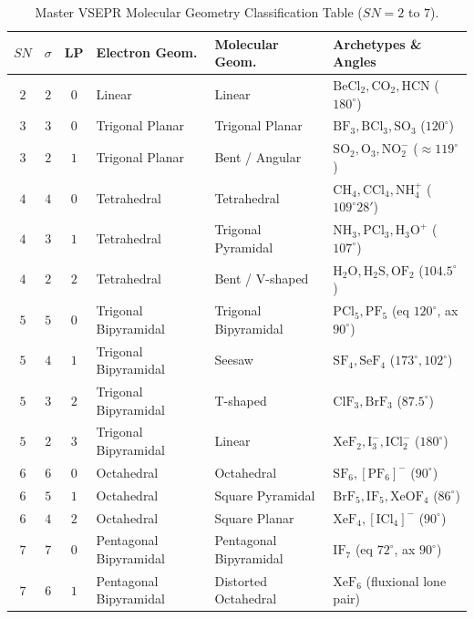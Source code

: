 \documentclass[10pt,twoside,openright]{book}
\begin{document}
\begin{table}[htbp]
\centering
\small
\renewcommand{\arraystretch}{1.25}
{\fontsize{7.5pt}{9.0pt}\selectfont\setlength{\tabcolsep}{1.5pt}
\begin{tabularx}{\linewidth}{c c c >{\RaggedRight\hsize=0.85\hsize}X >{\RaggedRight\hsize=0.95\hsize}X >{\RaggedRight\hsize=1.2\hsize}X}
\toprule
$SN$ & $\sigma$ & LP & \textbf{Electron Geom.} & \textbf{Molecular Geom.} & \textbf{Archetypes \& Angles} \\
\midrule
$2$ & $2$ & $0$ & Linear & Linear & $\mathrm{BeCl_2, CO_2, HCN}$ ($180^\circ$) \\
\midrule
$3$ & $3$ & $0$ & Trigonal Planar & Trigonal Planar & $\mathrm{BF_3, BCl_3, SO_3}$ ($120^\circ$) \\
$3$ & $2$ & $1$ & Trigonal Planar & Bent / Angular & $\mathrm{SO_2, O_3, NO_2^-}$ ($\approx 119^\circ$) \\
\midrule
$4$ & $4$ & $0$ & Tetrahedral & Tetrahedral & $\mathrm{CH_4, CCl_4, NH_4^+}$ ($109^\circ 28'$) \\
$4$ & $3$ & $1$ & Tetrahedral & Trigonal Pyramidal & $\mathrm{NH_3, PCl_3, H_3O^+}$ ($107^\circ$) \\
$4$ & $2$ & $2$ & Tetrahedral & Bent / V-shaped & $\mathrm{H_2O, H_2S, OF_2}$ ($104.5^\circ$) \\
\midrule
$5$ & $5$ & $0$ & Trigonal Bipyramidal & Trigonal Bipyramidal & $\mathrm{PCl_5, PF_5}$ (eq $120^\circ$, ax $90^\circ$) \\
$5$ & $4$ & $1$ & Trigonal Bipyramidal & Seesaw & $\mathrm{SF_4, SeF_4}$ ($173^\circ, 102^\circ$) \\
$5$ & $3$ & $2$ & Trigonal Bipyramidal & T-shaped & $\mathrm{ClF_3, BrF_3}$ ($87.5^\circ$) \\
$5$ & $2$ & $3$ & Trigonal Bipyramidal & Linear & $\mathrm{XeF_2, I_3^-, ICl_2^-}$ ($180^\circ$) \\
\midrule
$6$ & $6$ & $0$ & Octahedral & Octahedral & $\mathrm{SF_6, [PF_6]^-}$ ($90^\circ$) \\
$6$ & $5$ & $1$ & Octahedral & Square Pyramidal & $\mathrm{BrF_5, IF_5, XeOF_4}$ ($86^\circ$) \\
$6$ & $4$ & $2$ & Octahedral & Square Planar & $\mathrm{XeF_4, [ICl_4]^-}$ ($90^\circ$) \\
\midrule
$7$ & $7$ & $0$ & Pentagonal Bipyramidal & Pentagonal Bipyramidal & $\mathrm{IF_7}$ (eq $72^\circ$, ax $90^\circ$) \\
$7$ & $6$ & $1$ & Pentagonal Bipyramidal & Distorted Octahedral & $\mathrm{XeF_6}$ (fluxional lone pair) \\
\bottomrule
\end{tabularx}}
\caption{Master VSEPR Molecular Geometry Classification Table ($SN = 2$ to $7$).}
\end{table}
\end{document}
